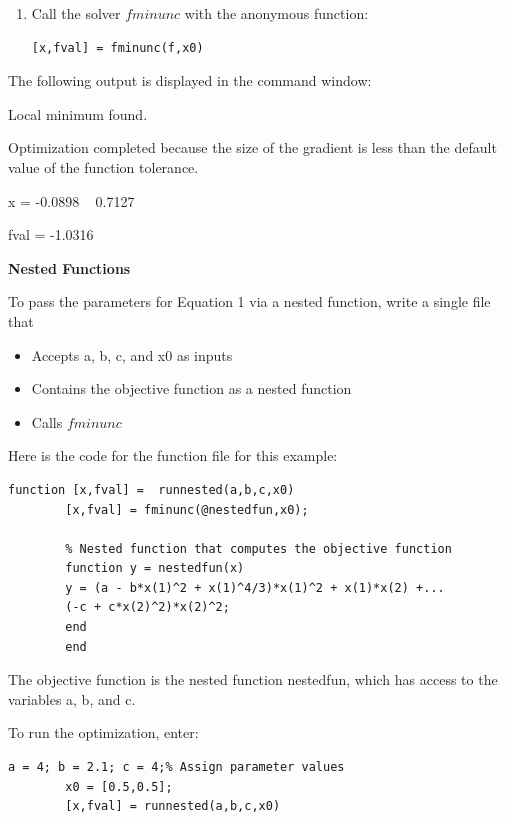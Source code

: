 \documentclass[cn,10pt,math=newtx,citestyle=gb7714-2015,bibstyle=gb7714-2015]{elegantbook}
\begin{document}
{{\begin{enumerate}
		\item Call the solver $fminunc$ with the anonymous function:
		\begin{lstlisting}[frame=shadowbox]
			[x,fval] = fminunc(f,x0)
		\end{lstlisting}
	\end{enumerate}
	
	The following output is displayed in the command window:
	
	Local minimum found.
	
	Optimization completed because the size of the gradient is less than the default value of the function tolerance.
	
	x =
	-0.0898  ~  0.7127
	
	fval =
	-1.0316
	
	\textbf{Nested Functions}   
	
	To pass the parameters for Equation 1 via a nested function, write a single file that
	
	\begin{itemize}
		\item Accepts a, b, c, and x0 as inputs
		
		\item Contains the objective function as a nested function
		
		\item Calls $fminunc$
	\end{itemize}
	
	Here is the code for the function file for this example:
	
	
	\begin{lstlisting}[frame=shadowbox]
		function [x,fval] =  runnested(a,b,c,x0)
		[x,fval] = fminunc(@nestedfun,x0);
		
		% Nested function that computes the objective function
		function y = nestedfun(x)
		y = (a - b*x(1)^2 + x(1)^4/3)*x(1)^2 + x(1)*x(2) +...
		(-c + c*x(2)^2)*x(2)^2;
		end
		end
	\end{lstlisting}
	
	The objective function is the nested function nestedfun, which has access to the variables a, b, and c.
	
	To run the optimization, enter:
	
	\begin{lstlisting}[frame=shadowbox]
		a = 4; b = 2.1; c = 4;% Assign parameter values
		x0 = [0.5,0.5];
		[x,fval] = runnested(a,b,c,x0)
		
	\end{lstlisting}
	
}}
\end{document}
